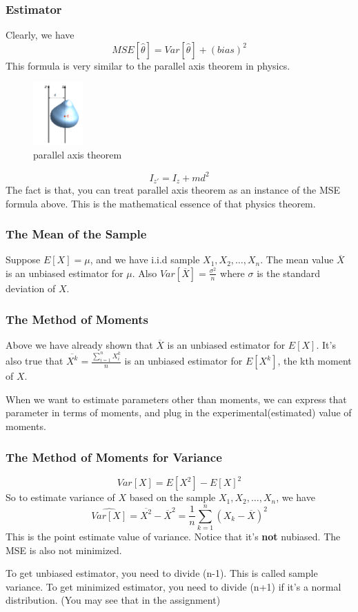 \documentclass{beamer}
\begin{document}
\begin{frame}
    \frametitle{Estimator}
    Clearly, we have
    \[MSE[\hat{\theta}]=Var[\hat{\theta}]+(bias)^2\]
    This formula is very similar to the parallel axis theorem in physics. 
    \begin{figure}[H]
        \centering
        \includegraphics[width=0.17\textwidth,height=0.17\textwidth]{Steiner.png}
        \caption{parallel axis theorem}
    \end{figure}\par
    \[I_{z'}=I_{z}+md^2\]
    The fact is that, you can treat parallel axis theorem as an instance of the MSE formula above. This is the mathematical essence of that physics theorem.
    
\end{frame}

\begin{frame}
    \frametitle{The Mean of the Sample}
    Suppose $E[X]=\mu$, and we have i.i.d sample $X_1,X_2,\dots , X_n$. The mean value $\overline{X}$ is an unbiased estimator for $\mu$. Also $Var[\overline{X}]=\frac{\sigma^2}{n}$ where $\sigma$ is the standard deviation of $X$.
    

\end{frame}

\begin{frame}
    \frametitle{The Method of Moments}
    Above we have already shown that $\overline{X}$ is an unbiased estimator for $E[X]$. It's also true that $\overline{X^k}=\frac{\sum\limits_{i=1}^n X_{i}^k}{n}$ is an unbiased estimator for $E[X^k]$, the kth moment of $X$.\par
    When we want to estimate parameters other than moments, we can express that parameter in terms of moments, and plug in the experimental(estimated) value of moments.
    

\end{frame}

\begin{frame}
    \frametitle{The Method of Moments for Variance}
    \[Var[X]=E[X^2]-E[X]^2\]
    So to estimate variance of $X$ based on the sample $X_1,X_2,\dots , X_n$, we have 
    \[\widehat{Var[X]}=\overline{X^2}-\overline{X}^2=\frac{1}{n}\sum\limits_{k=1}^n (X_k-\overline{X})^2\]
    This is the point estimate value of variance. Notice that it's \textbf{not} nubiased. The MSE is also not minimized.\par
    To get unbiased estimator, you need to divide (n-1). This is called sample variance. To get minimized estimator, you need to divide (n+1) if it's a normal distribution. (You may see that in the assignment)

    

\end{frame}
\end{document}
